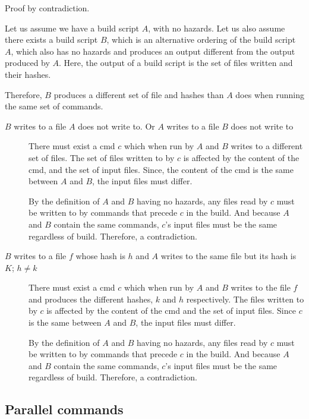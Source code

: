 Proof by contradiction.

Let us assume we have a build script $A$, with no hazards.  Let us also assume there exists a build script $B$, which is an alternative ordering of the build script $A$, which also has no hazards and produces an output different from the output produced by $A$.  Here, the output of a build script is the set of files written and their hashes.

Therefore, $B$ produces a different set of file and hashes than $A$ does when running the same set of commands.

\begin{description}
\item [$B$ writes to a file $A$ does not write to. Or $A$ writes to a file $B$ does not write to]
  There must exist a cmd $c$ which when run by $A$ and $B$ writes to a different set of files.  The set of files written to by $c$ is affected by the content of the cmd, and the set of input files.  Since, the content of the cmd is the same between $A$ and $B$, the input files must differ.

  By the definition of $A$ and $B$ having no hazards, any files read by $c$ must be written to by commands that precede $c$ in the build. And because $A$ and $B$ contain the same commands, $c$'s input files must be the same regardless of build.  Therefore, a contradiction.

\item [$B$ writes to a file $f$ whose hash is $h$ and $A$ writes to the same file but its hash is $K$; $h \neq k$]
  There must exist a cmd $c$ which when run by $A$ and $B$ writes to the file $f$ and produces the different hashes, $k$ and $h$ respectively.  The files written to by $c$ is affected by the content of the cmd and the set of input files. Since $c$ is the same between $A$ and $B$, the input files must differ.

  By the definition of $A$ and $B$ having no hazards, any files read by $c$ must be written to by commands that precede $c$ in the build.  And because $A$ and $B$ contain the same commands, $c$'s input files must be the same regardless of build.  Therefore, a contradiction.
  
\end{description}

\subsection{Parallel commands}
\label{sec:proof:parallel}

